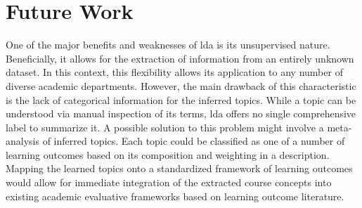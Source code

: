 \section{Future Work}
\label{sec:future-work}


One of the major benefits and weaknesses of \ac{lda} is its unsupervised nature.
Beneficially, it allows for the extraction of information from an entirely unknown dataset.
In this context, this flexibility allows its application to any number of diverse academic departments.
However, the main drawback of this characteristic is the lack of categorical information for the inferred topics.
While a topic can be understood via manual inspection of its terms, \ac{lda} offers no single comprehensive label to summarize it.
A possible solution to this problem might involve a meta-analysis of inferred topics.
Each topic could be classified as one of a number of learning outcomes based on its composition and weighting in a description.
Mapping the learned topics onto a standardized framework of learning outcomes \cite{krathwohl2002} would allow for immediate integration of the extracted course concepts into existing academic evaluative frameworks based on learning outcome literature.


